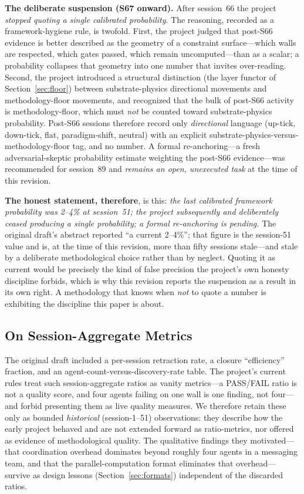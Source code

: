\documentclass[12pt,a4paper]{article}
\begin{document}
\textbf{The deliberate suspension (S67 onward).} After session~66 the project \emph{stopped quoting a single calibrated probability}. The reasoning, recorded as a framework-hygiene rule, is twofold. First, the project judged that post-S66 evidence is better described as the geometry of a constraint surface---which walls are respected, which gates passed, which remain uncomputed---than as a scalar; a probability collapses that geometry into one number that invites over-reading. Second, the project introduced a structural distinction (the layer functor of Section~\ref{sec:floor}) between substrate-physics directional movements and methodology-floor movements, and recognized that the bulk of post-S66 activity is methodology-floor, which must \emph{not} be counted toward substrate-physics probability. Post-S66 sessions therefore record only \emph{directional} language (up-tick, down-tick, flat, paradigm-shift, neutral) with an explicit substrate-physics-versus-methodology-floor tag, and no number. A formal re-anchoring---a fresh adversarial-skeptic probability estimate weighting the post-S66 evidence---was recommended for session~89 and \emph{remains an open, unexecuted task} at the time of this revision.

\textbf{The honest statement, therefore}, is this: \emph{the last calibrated framework probability was 2--4\% at session~51; the project subsequently and deliberately ceased producing a single probability; a formal re-anchoring is pending.} The original draft's abstract reported ``a current 2--4\%''; that figure is the session-51 value and is, at the time of this revision, more than fifty sessions stale---and stale by a deliberate methodological choice rather than by neglect. Quoting it as current would be precisely the kind of false precision the project's own honesty discipline forbids, which is why this revision reports the suspension as a result in its own right. A methodology that knows when \emph{not} to quote a number is exhibiting the discipline this paper is about.

\subsection{On Session-Aggregate Metrics}
\label{sec:no-vanity}

The original draft included a per-session retraction rate, a closure ``efficiency'' fraction, and an agent-count-versus-discovery-rate table. The project's current rules treat such session-aggregate ratios as vanity metrics---a PASS/FAIL ratio is not a quality score, and four agents failing on one wall is one finding, not four---and forbid presenting them as live quality measures. We therefore retain these only as bounded \emph{historical} (session-1--51) observations: they describe how the early project behaved and are not extended forward as ratio-metrics, nor offered as evidence of methodological quality. The qualitative findings they motivated---that coordination overhead dominates beyond roughly four agents in a messaging team, and that the parallel-computation format eliminates that overhead---survive as design lessons (Section~\ref{sec:formats}) independent of the discarded ratios.
\end{document}
